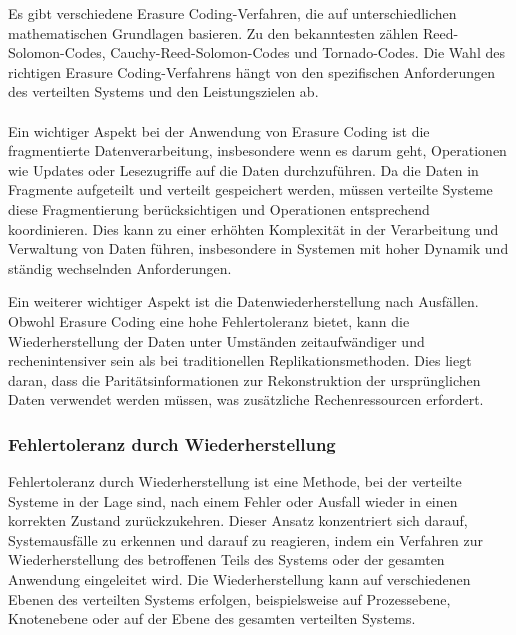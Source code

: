 \documentclass[../vs-script-first-v01.tex]{subfiles}
\begin{document}
Es gibt verschiedene Erasure Coding-Verfahren, die auf unterschiedlichen mathematischen Grundlagen basieren. Zu den bekanntesten zählen Reed-Solomon-Codes, Cauchy-Reed-Solomon-Codes und Tornado-Codes. Die Wahl des richtigen Erasure Coding-Verfahrens hängt von den spezifischen Anforderungen des verteilten Systems und den Leistungszielen ab.
\\\\
Ein wichtiger Aspekt bei der Anwendung von Erasure Coding ist die fragmentierte Datenverarbeitung, insbesondere wenn es darum geht, Operationen wie Updates oder Lesezugriffe auf die Daten durchzuführen. Da die Daten in Fragmente aufgeteilt und verteilt gespeichert werden, müssen verteilte Systeme diese Fragmentierung berücksichtigen und Operationen entsprechend koordinieren. Dies kann zu einer erhöhten Komplexität in der Verarbeitung und Verwaltung von Daten führen, insbesondere in Systemen mit hoher Dynamik und ständig wechselnden Anforderungen.

Ein weiterer wichtiger Aspekt ist die Datenwiederherstellung nach Ausfällen. Obwohl Erasure Coding eine hohe Fehlertoleranz bietet, kann die Wiederherstellung der Daten unter Umständen zeitaufwändiger und rechenintensiver sein als bei traditionellen Replikationsmethoden. Dies liegt daran, dass die Paritätsinformationen zur Rekonstruktion der ursprünglichen Daten verwendet werden müssen, was zusätzliche Rechenressourcen erfordert.

\subsubsection{Fehlertoleranz durch Wiederherstellung}

Fehlertoleranz durch Wiederherstellung ist eine Methode, bei der verteilte Systeme in der Lage sind, nach einem Fehler oder Ausfall wieder in einen korrekten Zustand zurückzukehren. Dieser Ansatz konzentriert sich darauf, Systemausfälle zu erkennen und darauf zu reagieren, indem ein Verfahren zur Wiederherstellung des betroffenen Teils des Systems oder der gesamten Anwendung eingeleitet wird. Die Wiederherstellung kann auf verschiedenen Ebenen des verteilten Systems erfolgen, beispielsweise auf Prozessebene, Knotenebene oder auf der Ebene des gesamten verteilten Systems.
\end{document}
